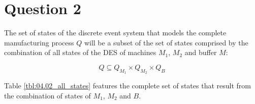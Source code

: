 \section{Question 2}

The set of states of the discrete event system that models the complete
manufacturing process $Q$ will be a subset of the set of states comprised by
the combination of all states of the DES of machines $M_1$, $M_2$ and buffer $M$:

$$Q \subseteq Q_{M_1} \times Q_{M_2} \times Q_{B}$$

Table \ref{tbl:04.02_all_states} features the complete set of states that result
from the combination of states of $M_1$, $M_2$ and $B$.

